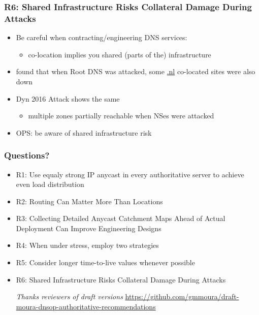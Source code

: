 \documentclass[11pt,show 
notes,notheorems,noamsthm,blank]{beamer} %
\begin{document}
\begin{frame}
 \frametitle{R6:  Shared Infrastructure Risks Collateral Damage During 
Attacks}
 \begin{itemize}
  \item Be careful when contracting/engineering DNS services:
  
  \begin{itemize}
   \item  co-location implies you shared  (parts of the) infrastructure
  \end{itemize}


\item \cite{Moura16b} found that when Root DNS was attacked, some \url{.nl}
co-located sites were also down
\item Dyn 2016 Attack shows the same  
\begin{itemize}
 \item multiple zones partially reachable 
when NSes were attacked
\end{itemize}


\item OPS: be aware of shared infrastructure risk
 \end{itemize}

\end{frame}




\begin{frame}
 \frametitle{Questions?}

 \begin{itemize}
  \item R1: Use equaly strong IP anycast in every authoritative server to
    achieve even load distribution~\cite{Mueller17b}
    
  \item R2:  Routing Can Matter More Than Locations~\cite{Schmidt17a}
  
  \item R3: Collecting Detailed Anycast Catchment Maps Ahead of Actual
    Deployment Can Improve Engineering Designs~\cite{Vries17b}
    
  \item R4:    When under stress, employ two strategies~\cite{Moura16b}
  
  \item R5:  Consider longer time-to-live values whenever 
possible~\cite{Moura18b}
  
    \item R6:  Shared Infrastructure Risks Collateral Damage During 
Attacks~\cite{Moura16b}
    
 \vspace{1cm}
 \centering \textit{Thanks  reviewers of draft versions}
 \centering \small 
\url{https://github.com/gmmoura/draft-moura-dnsop-authoritative-recommendations}
  

 \end{itemize}

\end{frame}
\end{document}
